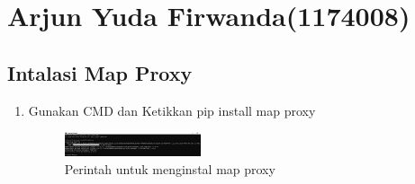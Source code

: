 \section{Arjun Yuda Firwanda(1174008)}
\subsection{Intalasi Map Proxy}
\begin{enumerate}
    \item Gunakan CMD dan Ketikkan pip install map proxy
    \hfill\break
    \begin{figure}[H]
		\includegraphics[width=4cm]{figures/1174008/5/1.png}
		\centering
		\caption{Perintah untuk menginstal map proxy}
    \end{figure}
\end{enumerate}

